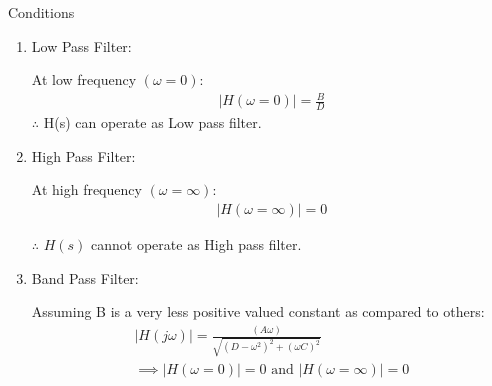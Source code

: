 \documentclass[journal,12pt,twocolumn]{IEEEtran}
\theoremstyle{remark}
\begin{document}
\begin{table}[htbp]
\setlength{\extrarowheight}{4pt}
\setlength{\tabcolsep}{3pt}
\centering

\caption{Conditions}
\label{tab:inputs.EE.11.2022}
\end{table}
\begin{enumerate}[label={\alph*)}]
    \item Low Pass Filter:
    
  At low frequency $(\omega = 0 )$:
 \begin{align}
     |H(\omega = 0)| = \frac{B}{D}\label{eq:lowpass.EE.11.2022}
 \end{align}
$\therefore$ H(s) can operate as Low pass filter.

\item High Pass Filter:


At high frequency $(\omega = \infty )$:
 \begin{align}
     |H(\omega = \infty)| = 0 \label{eq:highpass.EE.11.2022}
 \end{align}
 
$\therefore$ $H(s)$ cannot operate as High pass filter.
\item Band Pass Filter:

 Assuming B is a very less positive valued constant as compared to others:
\begin{align}
        |H(j\omega)| = \frac{(A\omega)}{\sqrt{(D - \omega^2)^2 + (\omega C)^2}}\\
   \implies      |H(\omega = 0)| = 0 \text{ and }  |H(\omega = \infty)| = 0 \label{eq:bandpass.EE.11.2022}
\end{align}

\end{enumerate}
\end{document}
